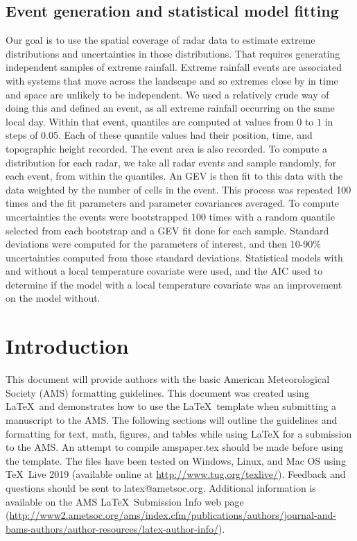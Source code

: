 \documentclass{ametsocV5}
\begin{document}
\subsection{Event generation and statistical model fitting}
\label{subsect:event}
Our goal is to use the spatial coverage of radar data to estimate extreme distributions and uncertainties in those distributions. That requires generating independent samples of extreme rainfall. Extreme rainfall events are associated with systems that move across the landscape and so extremes close by in time and space are unlikely to be independent.  We used a relatively crude way of doing this and defined an event,  as all extreme rainfall occurring on the same local  day.  Within that event, quantiles are computed at values from $0$ to $1$ in steps of $0.05$. Each of these quantile values had their position, time, and topographic height recorded. The event area is also recorded.
To compute a distribution for each radar, we take all radar events and sample randomly, for each event, from within the quantiles. An GEV is then fit to this data \citep{gilleland2016extremes} with the data weighted by the number of cells in the event. This process was repeated 100 times and the fit parameters and parameter covariances averaged. To compute uncertainties the events were bootstrapped 100 times with a random quantile selected from each bootstrap and a GEV fit done for each sample. Standard deviations were computed for the parameters of interest, and then 10-90\% uncertainties computed from those standard deviations.  Statistical models with and without a local temperature covariate were used, and the AIC used to determine if  the model with a local temperature covariate was an improvement on the model without. 



\section{Introduction}

This document will provide authors with the basic American Meteorological
Society (AMS) formatting guidelines. This document was created using \LaTeX\
and demonstrates how to use the \LaTeX\ template when submitting a manuscript
to the AMS.  The following sections will outline the guidelines and
formatting for text, math, figures, and tables while using \LaTeX\/ for a
submission to the AMS. An attempt to compile amspaper.tex should be made
before using the template. The files have been tested on Windows, Linux, and
Mac OS using \TeX\ Live 2019 (available online at
\url{http://www.tug.org/texlive/}). Feedback and questions should be sent to
latex@ametsoc.org. Additional information is available on the AMS \LaTeX\ Submission Info
web page (\url{http://www2.ametsoc.org/ams/index.cfm/publications/authors/journal-and-bams-authors/author-resources/latex-author-info/}).
\end{document}
